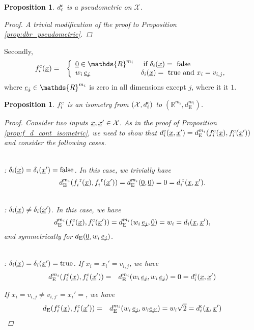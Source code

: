 \documentclass[letterpaper]{article}
\newcommand{\vect}[1]{\underline{\smash{#1}}}
\renewcommand{\v}[1]{\vect{#1}}
\newcommand{\reals}{\mathds{R}}
\newcommand{\sX}{\mathcal{X}}
\newcommand{\br}{^{\text{\textnormal{ r}}}}
\newcommand{\cat}{^{\text{\textnormal{c}}}}
\newtheorem{prop}[thm]{Proposition}
\begin{document}
\begin{prop}
 $d\cat_i$ is a pseudometric on $\sX$.
 \begin{proof}
 A trivial modification of the proof to Proposition \ref{prop:dbr_pseudometric}.
 \end{proof}
\end{prop}

Secondly,
\begin{eqnarray}
\nonumber{}f\cat_i(\v{x}) & = & \left\{\begin{array}{ll}
\v{0} \in \reals^{m_i} & \textrm{ if } \delta_i(\v{x}) = \textrm{ false }\\
\nonumber{} w_i\,\v{e_j} & \delta_i(\v{x}) = \textrm{ true and } x_i = v_{i,j},
\end{array}\right.
\end{eqnarray}
\noindent{}where $\v{e_j} \in \reals^{m_i}$ is zero in all dimensions except $j$, where it it $1$.

\begin{prop}$f\cat_i$ is an isometry from $(\sX, d\cat_i)$ to $(\reals^{m_i},d_{\text{E}}^{m_i})$.
\label{prop:f_d_cat_isometric}
\begin{proof}
Consider two inputs $\v{x},\v{x}' \in \sX$. As in the proof of Proposition \ref{prop:f_d_cont_isometric}, we need to show that $d\cat_i(\v{x},\v{x}') = d_{\text{E}}^{m_i}(f\cat_i(\v{x}),f\cat_i(\v{x}'))$ and consider the following cases.

~\\: $\delta_i(\v{x}) = \delta_i(\v{x}') = \textrm{false}$.
In this case, we trivially have 
\[d_{\text{E}}^{m_i}(f_i\br(\v{x}),f_i\br(\v{x}')) = d_{\text{E}}^{m_i}(\v{0}, \v{0}) = 0 = d_i\br(\v{x},\v{x}').\]

~\\: $\delta_i(\v{x}) \neq \delta_i(\v{x}')$. In this case, we have
\[d_{\text{E}}^{m_i}(f\cat_i(\v{x}),f\cat_i(\v{x}')) = d_{\text{E}}^{m_i}(w_i\,\v{e_j}, \v{0}) = w_i = d_i(\v{x},\v{x}'),\]
and symmetrically for $d_{\text{E}}(\v{0}, w_i\,\v{e_j})$.

~\\: $\delta_i(\v{x}) = \delta_i(\v{x}') = \textrm{true}$. 
If $x_i=x_i'=v_{i,j}$, we have 
\begin{eqnarray}
\nonumber{}d_{\text{E}}^{m_i}(f\cat_i(\v{x}),f\cat_i(\v{x}')) & = & d_{\text{E}}^{m_i}(w_i\,\v{e_j}, w_i\,\v{e_j}) = 0 = d\cat_i(\v{x}, \v{x}')
\end{eqnarray}

\noindent{}If $x_i=v_{i,j} \neq v_{i,j'} = x_i'=$, we have 
\begin{eqnarray} 
\nonumber{}d_{\text{E}}(f\cat_i(\v{x}),f\cat_i(\v{x}')) & = & d_{\text{E}}^{m_i}(w_i\,\v{e_j}, w_i \v{e_{j'}}) = w_i \sqrt{2} = d\cat_i(\v{x}, \v{x}')
\end{eqnarray}
\end{proof}
\end{prop}

%
\end{document}
